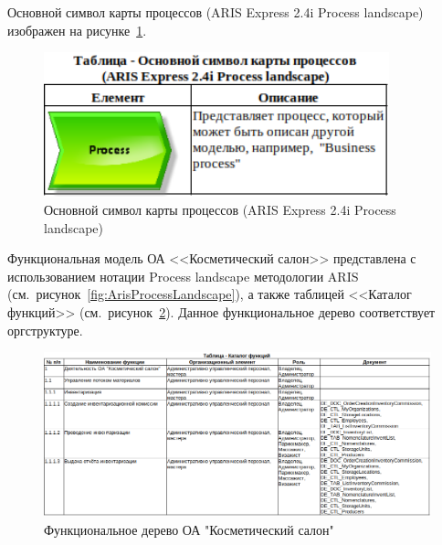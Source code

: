 Основной символ карты процессов (ARIS Express 2.4i \cite{ArisExpress} Process landscape)
изображен на рисунке~\ref{fig:ProcessLandscapeElement}.

\begin{figure}[!h]
    \centering

    \includegraphics[width=10cm]
    {assets/ARIS/ProcessLandscape/Element/ProcessLandscapeElement.png}

    \caption{Основной символ карты процессов (ARIS Express 2.4i Process landscape)}

    \label{fig:ProcessLandscapeElement}
\end{figure}

Функциональная модель ОА <<Косметический салон>> представлена
с использованием нотации Process landscape методологии ARIS
(см.~рисунок~\ref{fig:ArisProcessLandscape}),
а также таблицей <<Каталог функций>>
(см.~рисунок~\ref{fig:ProcessLandscapeCatalog}).
Данное функциональное дерево соответствует оргструктуре.



\begin{figure}[!h]
    \centering

    \includegraphics[width=16cm]
    {assets/ARIS/ProcessLandscape/Catalog/ProcessLandscapeCatalog.png}

    \caption{Функциональное дерево ОА "Косметический салон"}

    \label{fig:ProcessLandscapeCatalog}
\end{figure}

